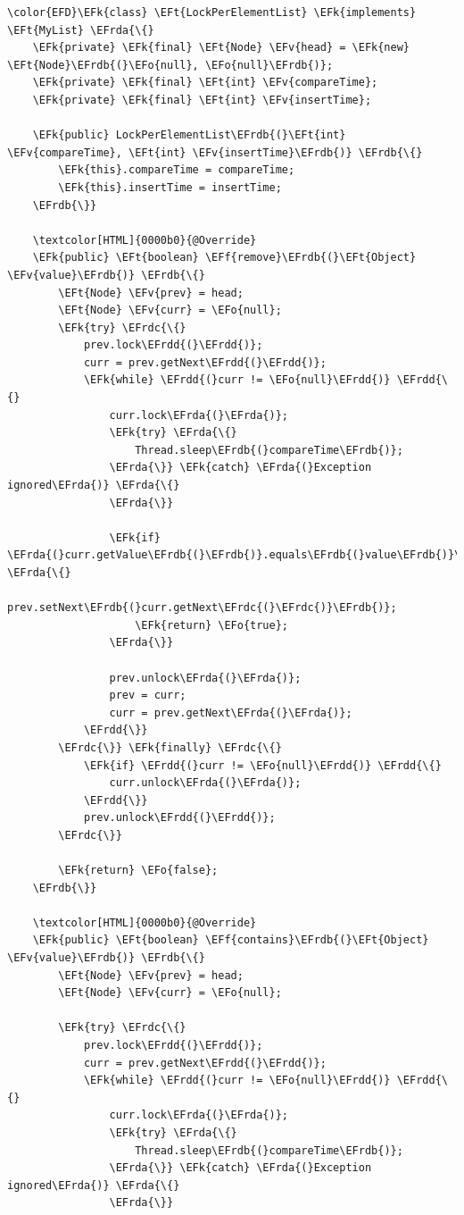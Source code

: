 \documentclass[11pt]{article}
\newcommand{\EFk}[1]{\textcolor{EFk}{#1}} %
\newcommand{\EFf}[1]{\textcolor{EFf}{#1}} %
\newcommand{\EFv}[1]{\textcolor{EFv}{#1}} %
\newcommand{\EFt}[1]{\textcolor{EFt}{#1}} %
\newcommand{\EFo}[1]{\textcolor{EFo}{#1}} %
\newcommand{\EFrda}[1]{#1} %
\newcommand{\EFrdb}[1]{\textcolor{EFrdb}{#1}} %
\newcommand{\EFrdc}[1]{\textcolor{EFrdc}{#1}} %
\newcommand{\EFrdd}[1]{\textcolor{EFrdd}{#1}} %
\begin{document}
\begin{Code}
\begin{Verbatim}
\color{EFD}\EFk{class} \EFt{LockPerElementList} \EFk{implements} \EFt{MyList} \EFrda{\{}
    \EFk{private} \EFk{final} \EFt{Node} \EFv{head} = \EFk{new} \EFt{Node}\EFrdb{(}\EFo{null}, \EFo{null}\EFrdb{)};
    \EFk{private} \EFk{final} \EFt{int} \EFv{compareTime};
    \EFk{private} \EFk{final} \EFt{int} \EFv{insertTime};

    \EFk{public} LockPerElementList\EFrdb{(}\EFt{int} \EFv{compareTime}, \EFt{int} \EFv{insertTime}\EFrdb{)} \EFrdb{\{}
        \EFk{this}.compareTime = compareTime;
        \EFk{this}.insertTime = insertTime;
    \EFrdb{\}}

    \textcolor[HTML]{0000b0}{@Override}
    \EFk{public} \EFt{boolean} \EFf{remove}\EFrdb{(}\EFt{Object} \EFv{value}\EFrdb{)} \EFrdb{\{}
        \EFt{Node} \EFv{prev} = head;
        \EFt{Node} \EFv{curr} = \EFo{null};
        \EFk{try} \EFrdc{\{}
            prev.lock\EFrdd{(}\EFrdd{)};
            curr = prev.getNext\EFrdd{(}\EFrdd{)};
            \EFk{while} \EFrdd{(}curr != \EFo{null}\EFrdd{)} \EFrdd{\{}
                curr.lock\EFrda{(}\EFrda{)};
                \EFk{try} \EFrda{\{}
                    Thread.sleep\EFrdb{(}compareTime\EFrdb{)};
                \EFrda{\}} \EFk{catch} \EFrda{(}Exception ignored\EFrda{)} \EFrda{\{}
                \EFrda{\}}

                \EFk{if} \EFrda{(}curr.getValue\EFrdb{(}\EFrdb{)}.equals\EFrdb{(}value\EFrdb{)}\EFrda{)} \EFrda{\{}
                    prev.setNext\EFrdb{(}curr.getNext\EFrdc{(}\EFrdc{)}\EFrdb{)};
                    \EFk{return} \EFo{true};
                \EFrda{\}}

                prev.unlock\EFrda{(}\EFrda{)};
                prev = curr;
                curr = prev.getNext\EFrda{(}\EFrda{)};
            \EFrdd{\}}
        \EFrdc{\}} \EFk{finally} \EFrdc{\{}
            \EFk{if} \EFrdd{(}curr != \EFo{null}\EFrdd{)} \EFrdd{\{}
                curr.unlock\EFrda{(}\EFrda{)};
            \EFrdd{\}}
            prev.unlock\EFrdd{(}\EFrdd{)};
        \EFrdc{\}}

        \EFk{return} \EFo{false};
    \EFrdb{\}}

    \textcolor[HTML]{0000b0}{@Override}
    \EFk{public} \EFt{boolean} \EFf{contains}\EFrdb{(}\EFt{Object} \EFv{value}\EFrdb{)} \EFrdb{\{}
        \EFt{Node} \EFv{prev} = head;
        \EFt{Node} \EFv{curr} = \EFo{null};

        \EFk{try} \EFrdc{\{}
            prev.lock\EFrdd{(}\EFrdd{)};
            curr = prev.getNext\EFrdd{(}\EFrdd{)};
            \EFk{while} \EFrdd{(}curr != \EFo{null}\EFrdd{)} \EFrdd{\{}
                curr.lock\EFrda{(}\EFrda{)};
                \EFk{try} \EFrda{\{}
                    Thread.sleep\EFrdb{(}compareTime\EFrdb{)};
                \EFrda{\}} \EFk{catch} \EFrda{(}Exception ignored\EFrda{)} \EFrda{\{}
                \EFrda{\}}


\end{Verbatim}
\end{Code}
\end{document}
